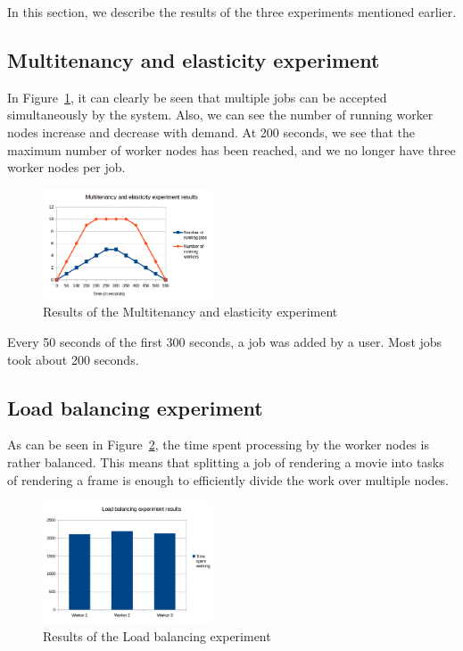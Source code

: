 In this section, we describe the results of the three experiments mentioned earlier.

\subsection{Multitenancy and elasticity experiment}
In Figure~\ref{fig:multitenancyexp}, it can clearly be seen that multiple jobs can be accepted simultaneously by the system.
Also, we can see the number of running worker nodes increase and decrease with demand.
At 200 seconds, we see that the maximum number of worker nodes has been reached, and we no longer have three worker nodes per job.

\begin{figure}[ht!]
    \center
    \includegraphics[width=0.45\textwidth]{./img/multitenancyexp.png}
    \caption{Results of the Multitenancy and elasticity experiment}
    \label{fig:multitenancyexp}
\end{figure}

Every 50 seconds of the first 300 seconds, a job was added by a user.
Most jobs took about 200 seconds.


\subsection{Load balancing experiment}
As can be seen in Figure~\ref{fig:loadbalancingexp}, the time spent processing by the worker nodes is rather balanced.
This means that splitting a job of rendering a movie into tasks of rendering a frame is enough to efficiently divide the work over multiple nodes.

\begin{figure}[ht!]
    \center
    \includegraphics[width=0.45\textwidth]{./img/loadbalancingexp.png}
    \caption{Results of the Load balancing experiment}
    \label{fig:loadbalancingexp}
\end{figure}

